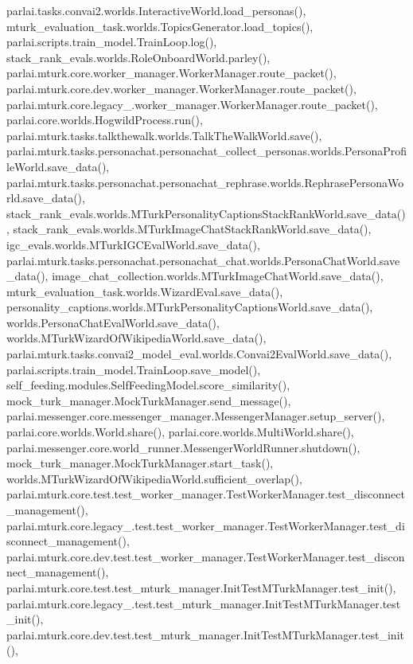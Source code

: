 parlai.\+tasks.\+convai2.\+worlds.\+Interactive\+World.\+load\+\_\+personas(), mturk\+\_\+evaluation\+\_\+task.\+worlds.\+Topics\+Generator.\+load\+\_\+topics(), parlai.\+scripts.\+train\+\_\+model.\+Train\+Loop.\+log(), stack\+\_\+rank\+\_\+evals.\+worlds.\+Role\+Onboard\+World.\+parley(), parlai.\+mturk.\+core.\+worker\+\_\+manager.\+Worker\+Manager.\+route\+\_\+packet(), parlai.\+mturk.\+core.\+dev.\+worker\+\_\+manager.\+Worker\+Manager.\+route\+\_\+packet(), parlai.\+mturk.\+core.\+legacy\+\_.\+worker\+\_\+manager.\+Worker\+Manager.\+route\+\_\+packet(), parlai.\+core.\+worlds.\+Hogwild\+Process.\+run(), parlai.\+mturk.\+tasks.\+talkthewalk.\+worlds.\+Talk\+The\+Walk\+World.\+save(), parlai.\+mturk.\+tasks.\+personachat.\+personachat\+\_\+collect\+\_\+personas.\+worlds.\+Persona\+Profile\+World.\+save\+\_\+data(), parlai.\+mturk.\+tasks.\+personachat.\+personachat\+\_\+rephrase.\+worlds.\+Rephrase\+Persona\+World.\+save\+\_\+data(), stack\+\_\+rank\+\_\+evals.\+worlds.\+M\+Turk\+Personality\+Captions\+Stack\+Rank\+World.\+save\+\_\+data(), stack\+\_\+rank\+\_\+evals.\+worlds.\+M\+Turk\+Image\+Chat\+Stack\+Rank\+World.\+save\+\_\+data(), igc\+\_\+evals.\+worlds.\+M\+Turk\+I\+G\+C\+Eval\+World.\+save\+\_\+data(), parlai.\+mturk.\+tasks.\+personachat.\+personachat\+\_\+chat.\+worlds.\+Persona\+Chat\+World.\+save\+\_\+data(), image\+\_\+chat\+\_\+collection.\+worlds.\+M\+Turk\+Image\+Chat\+World.\+save\+\_\+data(), mturk\+\_\+evaluation\+\_\+task.\+worlds.\+Wizard\+Eval.\+save\+\_\+data(), personality\+\_\+captions.\+worlds.\+M\+Turk\+Personality\+Captions\+World.\+save\+\_\+data(), worlds.\+Persona\+Chat\+Eval\+World.\+save\+\_\+data(), worlds.\+M\+Turk\+Wizard\+Of\+Wikipedia\+World.\+save\+\_\+data(), parlai.\+mturk.\+tasks.\+convai2\+\_\+model\+\_\+eval.\+worlds.\+Convai2\+Eval\+World.\+save\+\_\+data(), parlai.\+scripts.\+train\+\_\+model.\+Train\+Loop.\+save\+\_\+model(), self\+\_\+feeding.\+modules.\+Self\+Feeding\+Model.\+score\+\_\+similarity(), mock\+\_\+turk\+\_\+manager.\+Mock\+Turk\+Manager.\+send\+\_\+message(), parlai.\+messenger.\+core.\+messenger\+\_\+manager.\+Messenger\+Manager.\+setup\+\_\+server(), parlai.\+core.\+worlds.\+World.\+share(), parlai.\+core.\+worlds.\+Multi\+World.\+share(), parlai.\+messenger.\+core.\+world\+\_\+runner.\+Messenger\+World\+Runner.\+shutdown(), mock\+\_\+turk\+\_\+manager.\+Mock\+Turk\+Manager.\+start\+\_\+task(), worlds.\+M\+Turk\+Wizard\+Of\+Wikipedia\+World.\+sufficient\+\_\+overlap(), parlai.\+mturk.\+core.\+test.\+test\+\_\+worker\+\_\+manager.\+Test\+Worker\+Manager.\+test\+\_\+disconnect\+\_\+management(), parlai.\+mturk.\+core.\+legacy\+\_.\+test.\+test\+\_\+worker\+\_\+manager.\+Test\+Worker\+Manager.\+test\+\_\+disconnect\+\_\+management(), parlai.\+mturk.\+core.\+dev.\+test.\+test\+\_\+worker\+\_\+manager.\+Test\+Worker\+Manager.\+test\+\_\+disconnect\+\_\+management(), parlai.\+mturk.\+core.\+test.\+test\+\_\+mturk\+\_\+manager.\+Init\+Test\+M\+Turk\+Manager.\+test\+\_\+init(), parlai.\+mturk.\+core.\+legacy\+\_.\+test.\+test\+\_\+mturk\+\_\+manager.\+Init\+Test\+M\+Turk\+Manager.\+test\+\_\+init(), parlai.\+mturk.\+core.\+dev.\+test.\+test\+\_\+mturk\+\_\+manager.\+Init\+Test\+M\+Turk\+Manager.\+test\+\_\+init(), 
